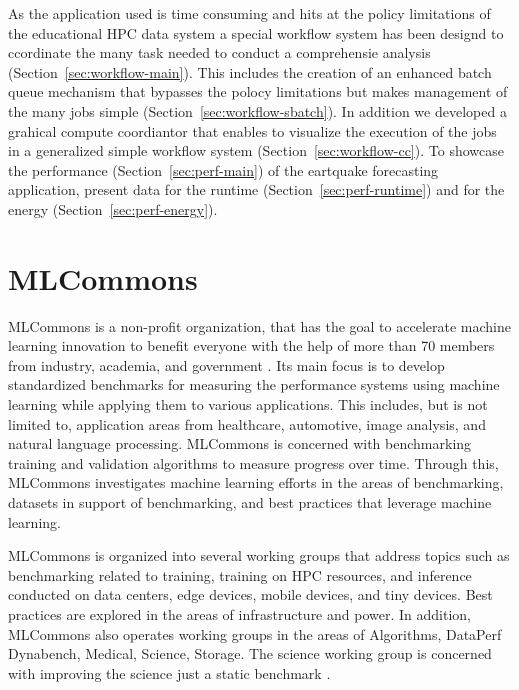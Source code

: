 \documentclass[utf8]{FrontiersinVancouver} %
\begin{document}
As the application used is time consuming and hits at the policy
limitations of the educational HPC data system a special workflow
system has been designd to ccordinate the many task needed to conduct
a comprehensie analysis (Section~\ref{sec:workflow-main}). This
includes the creation of an enhanced batch queue mechanism that
bypasses the polocy limitations but makes management of the many jobs
simple (Section~\ref{sec:workflow-sbatch}). In addition we developed a
grahical compute coordiantor that enables to visualize the execution
of the jobs in a generalized simple workflow system
(Section~\ref{sec:workflow-cc}).  To showcase the performance
(Section~\ref{sec:perf-main}) of the eartquake forecasting
application, present data for the runtime
(Section~\ref{sec:perf-runtime}) and for the energy
(Section~\ref{sec:perf-energy}).






\section{MLCommons}
\label{sec:mlcommons}

MLCommons is a non-profit organization, that has the goal to
accelerate machine learning innovation to benefit everyone with the
help of more than 70 members from industry, academia, and government
\citep{www-mlcommons}. Its main focus is to develop standardized
benchmarks for measuring the performance systems using machine
learning while applying them to various applications.  This includes,
but is not limited to, application areas from healthcare, automotive,
image analysis, and natural language processing. MLCommons is
concerned with benchmarking training \citep{mlperf-training} and
validation algorithms to measure progress over time.  Through this,
MLCommons investigates machine learning efforts in the areas of
benchmarking, datasets in support of benchmarking, and best practices
that leverage machine learning.

MLCommons is organized into several working groups that address topics
such as benchmarking related to training, training on HPC resources,
and inference conducted on data centers, edge devices, mobile devices, and
tiny devices. Best practices are explored in the areas of
infrastructure and power.  In addition, MLCommons also operates
working groups in the areas of Algorithms, DataPerf Dynabench,
Medical, Science, Storage.  The science working group is concerned
with improving the science just a static benchmark \citep{las-22-mlcommons-science}.
\end{document}
